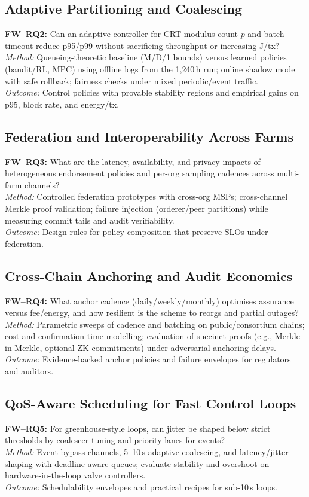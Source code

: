 \documentclass[12pt,onecolumn]{IEEEtran} %
\begin{document}
\subsection{Adaptive Partitioning and Coalescing}
\textbf{FW–RQ2:} Can an adaptive controller for CRT modulus count $p$ and batch timeout reduce p95/p99 without sacrificing throughput or increasing J/tx? \\
\textit{Method:} Queueing-theoretic baseline (M/D/1 bounds) versus learned policies (bandit/RL, MPC) using offline logs from the 1{,}240\,h run; online shadow mode with safe rollback; fairness checks under mixed periodic/event traffic. \\
\textit{Outcome:} Control policies with provable stability regions and empirical gains on p95, block rate, and energy/tx.

\subsection{Federation and Interoperability Across Farms}
\textbf{FW–RQ3:} What are the latency, availability, and privacy impacts of heterogeneous endorsement policies and per-org sampling cadences across multi-farm channels? \\
\textit{Method:} Controlled federation prototypes with cross-org MSPs; cross-channel Merkle proof validation; failure injection (orderer/peer partitions) while measuring commit tails and audit verifiability. \\
\textit{Outcome:} Design rules for policy composition that preserve SLOs under federation.

\subsection{Cross-Chain Anchoring and Audit Economics}
\textbf{FW–RQ4:} What anchor cadence (daily/weekly/monthly) optimises assurance versus fee/energy, and how resilient is the scheme to reorgs and partial outages? \\
\textit{Method:} Parametric sweeps of cadence and batching on public/consortium chains; cost and confirmation-time modelling; evaluation of succinct proofs (e.g., Merkle-in-Merkle, optional ZK commitments) under adversarial anchoring delays. \\
\textit{Outcome:} Evidence-backed anchor policies and failure envelopes for regulators and auditors.

\subsection{QoS-Aware Scheduling for Fast Control Loops}
\textbf{FW–RQ5:} For greenhouse-style loops, can jitter be shaped below strict thresholds by coalescer tuning and priority lanes for events? \\
\textit{Method:} Event-bypass channels, 5–10\,s adaptive coalescing, and latency/jitter shaping with deadline-aware queues; evaluate stability and overshoot on hardware-in-the-loop valve controllers. \\
\textit{Outcome:} Schedulability envelopes and practical recipes for sub-10\,s loops.
\end{document}

